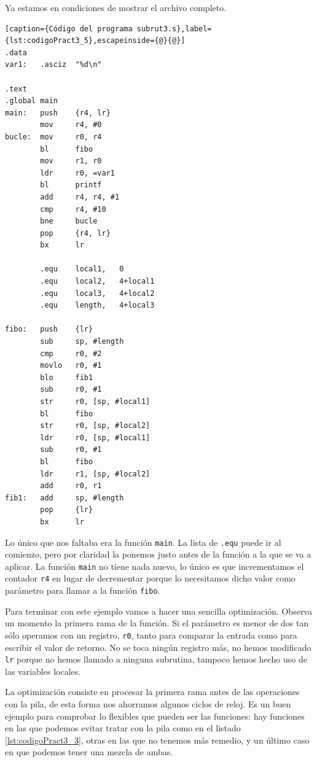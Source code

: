 Ya estamos en condiciones de mostrar el archivo completo.

\begin{lstlisting}[caption={Código del programa subrut3.s},label={lst:codigoPract3_5},escapeinside={@}{@}]
.data
var1:   .asciz  "%d\n"

.text
.global main
main:   push    {r4, lr}
        mov     r4, #0
bucle:  mov     r0, r4
        bl      fibo
        mov     r1, r0
        ldr     r0, =var1
        bl      printf
        add     r4, r4, #1
        cmp     r4, #10
        bne     bucle
        pop     {r4, lr}
        bx      lr

        .equ    local1,   0
        .equ    local2,   4+local1
        .equ    local3,   4+local2
        .equ    length,   4+local3

fibo:   push    {lr}
        sub     sp, #length
        cmp     r0, #2
        movlo   r0, #1
        blo     fib1
        sub     r0, #1
        str     r0, [sp, #local1]
        bl      fibo
        str     r0, [sp, #local2]
        ldr     r0, [sp, #local1]
        sub     r0, #1
        bl      fibo
        ldr     r1, [sp, #local2]
        add     r0, r1
fib1:   add     sp, #length
        pop     {lr}
        bx      lr
\end{lstlisting}

Lo único que nos faltaba era la función {\tt main}. La lista de {\tt .equ} puede
ir al comienzo, pero por claridad la ponemos justo antes de la función a la que
se va a aplicar. La función {\tt main} no tiene nada nuevo, lo único es que incrementamos
el contador {\tt r4} en lugar de decrementar porque lo necesitamos dicho valor como
parámetro para llamar a la función {\tt fibo}.

Para terminar con este ejemplo vamos a hacer una sencilla optimización. Observa un momento
la primera rama de la función. Si el parámetro es menor de dos tan sólo operamos con
un registro, {\tt r0}, tanto para comparar la entrada como para escribir el valor de retorno.
No se toca ningún registro más, no hemos modificado {\tt lr} porque no hemos llamado a ninguna
subrutina, tampoco hemos hecho uso de las variables locales.

La optimización consiste en procesar la primera rama antes de las operaciones con la pila,
de esta forma nos ahorramos algunos ciclos de reloj. Es un buen ejemplo para comprobar
lo flexibles que pueden ser las funciones: hay funciones en las que podemos evitar tratar
con la pila como en el listado \ref{lst:codigoPract3_3}, otras en las que no tenemos más
remedio, y un último caso en que podemos tener una mezcla de ambas.

